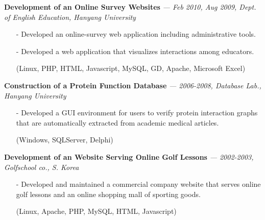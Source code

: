   \vspace{-0.15in}
{\bf Development of an Online Survey Websites}
  {\it \footnotesize --- Feb 2010, Aug 2009, Dept. of English Education, Hanyang University}
  \begin{itemize}[leftmargin=*]
    \setlength\itemsep{-0.02in}
     \item[-] Developed an online-survey web application including administrative tools.
     \item[-] Developed a web application that visualizes interactions among educators.
     \item[] {\small(Linux, PHP, HTML, Javascript, MySQL, GD, Apache, Microsoft Excel)}
  \end{itemize}

  \vspace{-0.15in}
  {\bf Construction of a Protein Function Database} 
    {\it \footnotesize --- 2006-2008, Database Lab., Hanyang University}
    \begin{itemize}[leftmargin=*]
    \setlength\itemsep{-0.02in}
    \item[-] Developed a GUI environment for users to verify protein interaction graphs
             that are automatically extracted from academic medical articles.
    \item[] {\small(Windows, SQLServer, Delphi)}
    \end{itemize}

    
  \vspace{-0.15in}
  {\bf Development of an Website Serving Online Golf Lessons}
    {\it \footnotesize --- 2002-2003, Golfschool co., S. Korea}
    \begin{itemize}[leftmargin=*]
    \setlength\itemsep{-0.02in}
     \item[-] Developed and maintained a commercial company website that 
              serves online golf lessons and an online shopping mall of sporting goods.
     \item[]  {\small(Linux, Apache, PHP, MySQL, HTML, Javascript)}
    \end{itemize}
